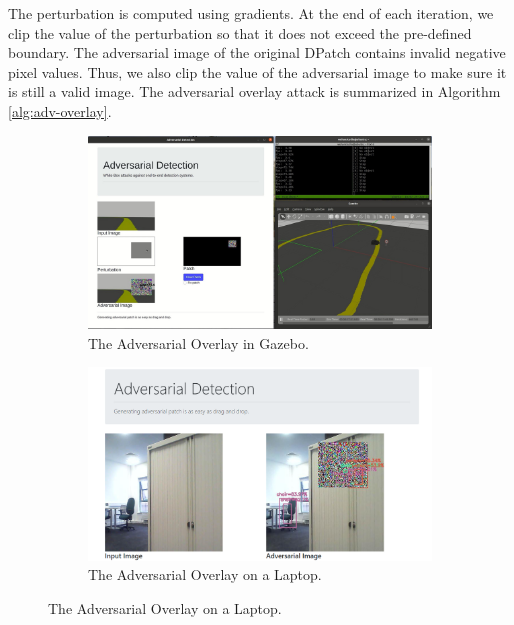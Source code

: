 The perturbation is computed using gradients. At the end of each iteration, we clip the value of the perturbation so that it does not exceed the pre-defined boundary. The adversarial image of the original DPatch \citep{liu2018dpatch} contains invalid negative pixel values. Thus, we also clip the value of the adversarial image to make sure it is still a valid image. The adversarial overlay attack is summarized in Algorithm \ref{alg:adv-overlay}.

\begin{figure}[b]
\centering
\begin{subfigure}[b]{0.31\textwidth}
    \centering
    \includegraphics[width=\textwidth]{figures/chapter_detection/gazebo.jpg}
    \caption{The Adversarial Overlay in Gazebo.}
    \label{fig:gazebo}
\end{subfigure}
\hfill
\begin{subfigure}[b]{0.31\textwidth}
    \centering
    \includegraphics[width=\textwidth]{figures/chapter_detection/pc.png}
    \caption{The Adversarial Overlay on a Laptop.}
    \label{fig:pc}
\end{subfigure}
\hfill

\end{figure}
